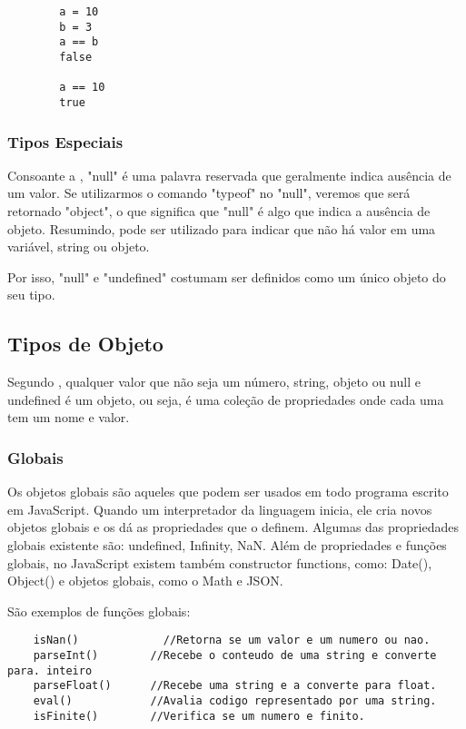 	\begin{lstlisting}
		a = 10
		b = 3
		a == b
		false
		
		a == 10
		true
	\end{lstlisting}
	\subsubsection{Tipos Especiais}
	Consoante a \cite{flanagan2020javascript}, "null" é uma palavra reservada que geralmente indica ausência de um valor. Se utilizarmos o comando "typeof" no "null", veremos que será retornado "object", o que significa que "null" é algo que indica a ausência de objeto. Resumindo, pode ser utilizado para indicar que não há valor em uma variável, string ou objeto. 
	
	Por isso, "null" e "undefined" costumam ser definidos como um único objeto do seu tipo.
	
	
	\subsection{Tipos de Objeto}
	Segundo \cite{flanagan2020javascript}, qualquer valor que não seja um número, string, objeto ou null e undefined é um objeto, ou seja, é uma coleção de propriedades onde cada uma tem um nome e valor.
	
	\subsubsection{Globais}
	Os objetos globais são aqueles que podem ser usados em todo programa escrito em JavaScript. Quando um interpretador da linguagem inicia, ele cria novos objetos globais e os dá as propriedades que o definem. 
	Algumas das propriedades globais existente são: undefined, Infinity, NaN.
	Além de propriedades e funções globais, no JavaScript existem também constructor functions, como: Date(), Object() e objetos globais, como o Math e JSON.
	
	São exemplos de funções globais: 
	\newline
	\begin{lstlisting}
	isNan()			  	//Retorna se um valor e um numero ou nao.
	parseInt()		  //Recebe o conteudo de uma string e converte para. inteiro
	parseFloat() 	  //Recebe uma string e a converte para float.
	eval()	  		  //Avalia codigo representado por uma string.
	isFinite()		  //Verifica se um numero e finito.
	
	\end{lstlisting}
	
